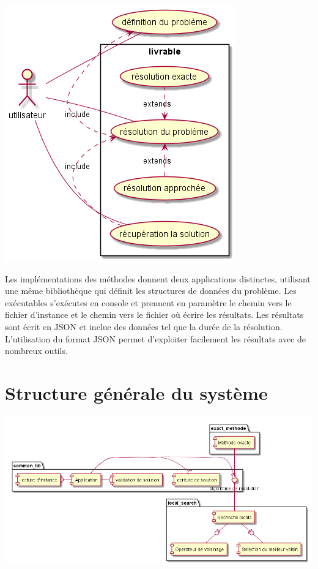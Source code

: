 \includegraphics[width=\textwidth]{parts/description_generale/use_cases}

Les implémentations des méthodes donnent deux applications distinctes, utilisant une même bibliothèque qui définit les structures de données du problème.
Les exécutables s'exécutes en console et prennent en paramètre le chemin vers le fichier d'instance et
le chemin vers le fichier où écrire les résultats.
Les résultats sont écrit en JSON et inclue des données tel que la durée de la résolution.
L'utilisation du format JSON permet d'exploiter facilement les résultats avec de nombreux outils.


\section{Structure générale du système}

\includegraphics[width=\textwidth]{parts/description_generale/composants}
